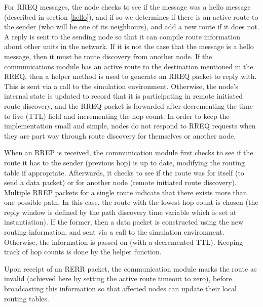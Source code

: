 For RREQ messages, the node checks to see if the message was a hello message (described in section \ref{hello}), and if so we determines if there is an active route to the sender (who will be one of its neighbours), and add a new route if it does not. A reply is sent to the sending node so that it can compile route information about other units in the network. If it is not the case that the message is a hello message, then it must be route discovery from another node. If the communications module has an active route to the destination mentioned in the RREQ, then a helper method is used to generate an RREQ packet to reply with. This is sent via a call to the simulation environment. Otherwise, the node's internal state is updated to record that it is participating in remote initiated route discovery, and the RREQ packet is forwarded after decrementing the time to live (TTL) field and incrementing the hop count. In order to keep the implementation small and simple, nodes do not respond to RREQ requests when they are part way through route discovery for themselves or another node.

When an RREP is received, the communication module first checks to see if the route it has to the sender (previous hop) is up to date, modifying the routing table if appropriate. Afterwards, it checks to see if the route was for itself (to send a data packet) or for another node (remote initiated route discovery). Multiple RREP packets for a single route indicate that there exists more than one possible path. In this case, the route with the lowest hop count is chosen (the reply window is defined by the path discovery time variable which is set at instantiation). If the former, then a data packet is constructed using the new routing information, and sent via a call to the simulation environment. Otherwise, the information is passed on (with a decremented TTL). Keeping track of hop counts is done by the helper function.

Upon receipt of an RERR packet, the communication module marks the route as invalid (achieved here by setting the active route timeout to zero), before broadcasting this information so that affected nodes can update their local routing tables.\\

